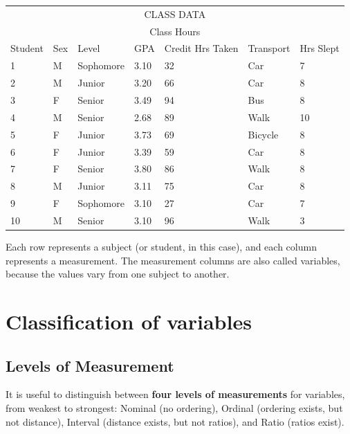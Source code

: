 \documentclass[11pt, chapterprefix=true]{scrbook}\usepackage[]{graphicx}\usepackage[]{color}
\begin{document}
  \begin{table}[htbp]
   \centering
  \begin{tabular}{@{} p{14mm} p{7mm} p{20mm} p{9mm} p{32mm} p{18mm} p{21mm} @{}} \hline %
   \multicolumn{7}{c}{CLASS DATA} \\
   \multicolumn{7}{c}{Class Hours} \\
   Student & Sex & Level & GPA & Credit Hrs Taken & Transport & Hrs Slept \\ \hline
   1 & M & Sophomore & 3.10 & 32 & Car & 7 \\
   2 & M & Junior & 3.20 & 66 & Car & 8 \\
   3 & F & Senior & 3.49 & 94 & Bus & 8 \\
   4 & M & Senior & 2.68 & 89 & Walk & 10 \\
   5 & F & Junior & 3.73 & 69 & Bicycle & 8 \\
   6 & F & Junior & 3.39 & 59 & Car & 8 \\
   7 & F & Senior & 3.80 & 86 & Walk & 8 \\
   8 & M & Junior & 3.11 & 75 & Car & 8 \\
   9 & F & Sophomore & 3.10 & 27 & Car & 7 \\
   10 & M & Senior & 3.10 & 96 & Walk & 3 \\ \hline
   \end{tabular}
   \end{table}

Each row represents a subject (or student, in this case), and each column represents a measurement.  The measurement columns are also called variables, because the values vary from one subject to another.

\section{Classification of variables}

\subsection{Levels of Measurement}

It is useful to distinguish between \textbf{four levels of measurements} for variables, from weakest to strongest: Nominal (no ordering), Ordinal (ordering exists, but not distance), Interval (distance exists, but not ratios), and Ratio (ratios exist).
\end{document}
